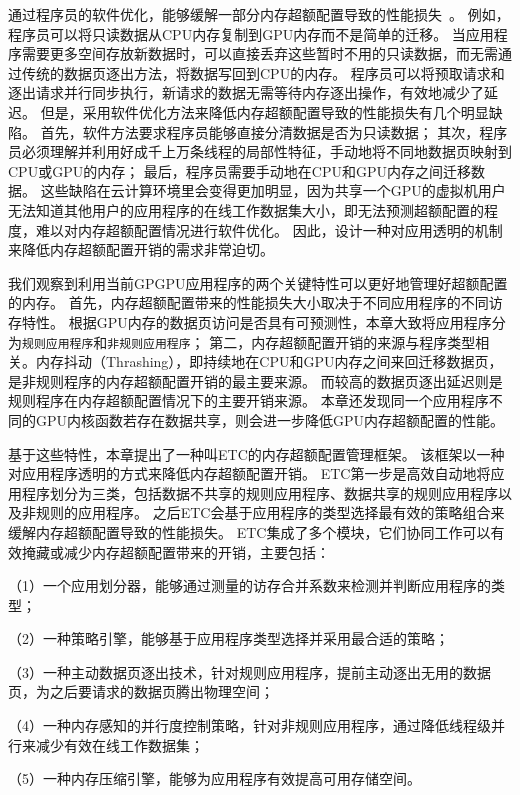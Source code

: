 通过程序员的软件优化，能够缓解一部分内存超额配置导致的性能损失~。
例如，程序员可以将只读数据从CPU内存复制到GPU内存而不是简单的迁移。
当应用程序需要更多空间存放新数据时，可以直接丢弃这些暂时不用的只读数据，而无需通过传统的数据页逐出方法，将数据写回到CPU的内存。
程序员可以将预取请求和逐出请求并行同步执行，新请求的数据无需等待内存逐出操作，有效地减少了延迟。
但是，采用软件优化方法来降低内存超额配置导致的性能损失有几个明显缺陷。
首先，软件方法要求程序员能够直接分清数据是否为只读数据；
其次，程序员必须理解并利用好成千上万条线程的局部性特征，手动地将不同地数据页映射到CPU或GPU的内存；
最后，程序员需要手动地在CPU和GPU内存之间迁移数据。
这些缺陷在云计算环境里会变得更加明显，因为共享一个GPU的虚拟机用户无法知道其他用户的应用程序的在线工作数据集大小，即无法预测超额配置的程度，难以对内存超额配置情况进行软件优化。
因此，设计一种对应用透明的机制来降低内存超额配置开销的需求非常迫切。

我们观察到利用当前GPGPU应用程序的两个关键特性可以更好地管理好超额配置的内存。
首先，内存超额配置带来的性能损失大小取决于不同应用程序的不同访存特性。
根据GPU内存的数据页访问是否具有可预测性，本章大致将应用程序分为\texttt{规则应用程序}和\texttt{非规则应用程序}；
第二，内存超额配置开销的来源与程序类型相关。内存抖动（Thrashing），即持续地在CPU和GPU内存之间来回迁移数据页，是非规则程序的内存超额配置开销的最主要来源。
而较高的数据页逐出延迟则是规则程序在内存超额配置情况下的主要开销来源。
本章还发现同一个应用程序不同的GPU内核函数若存在数据共享，则会进一步降低GPU内存超额配置的性能。

基于这些特性，本章提出了一种叫ETC的内存超额配置管理框架。
该框架以一种对应用程序透明的方式来降低内存超额配置开销。
ETC第一步是高效自动地将应用程序划分为三类，包括数据不共享的规则应用程序、数据共享的规则应用程序以及非规则的应用程序。
之后ETC会基于应用程序的类型选择最有效的策略组合来缓解内存超额配置导致的性能损失。
ETC集成了多个模块，它们协同工作可以有效掩藏或减少内存超额配置带来的开销，主要包括：

（1）一个应用划分器，能够通过测量的访存合并系数来检测并判断应用程序的类型；

（2）一种策略引擎，能够基于应用程序类型选择并采用最合适的策略；

（3）一种主动数据页逐出技术，针对规则应用程序，提前主动逐出无用的数据页，为之后要请求的数据页腾出物理空间；

（4）一种内存感知的并行度控制策略，针对非规则应用程序，通过降低线程级并行来减少有效在线工作数据集；

（5）一种内存压缩引擎，能够为应用程序有效提高可用存储空间。



